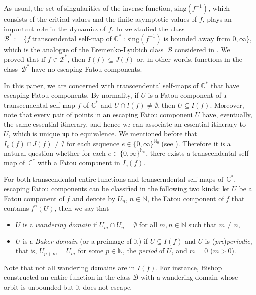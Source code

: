 \documentclass[a4paper, 12pt, reqno]{amsart}
\newcommand{\margin}[1]{\marginnote{\red{#1}}}
\numberwithin{equation}{section}
\newcommand{\red}[1]{{\color{red} #1}}
\theoremstyle{plain}
\theoremstyle{definition}
\theoremstyle{remark}
\newcommand{\C}{{\mathbb{C}}}
\newcommand{\CS}{{\mathbb{C}^*}}
\newcommand{\B}{\mathcal B}
\newcommand{\N}{{\mathbb{N}}}
\begin{document}
As usual, the set of singularities of the inverse function, $\mbox{sing}(f^{-1})$, which consists of the critical values and the finite asymptotic values of $f$, plays an important role in the dynamics of $f$. In \cite{fagella-martipete} we studied the class 
$$
\B^*:=\{f \mbox{ transcendental self-map of } \CS\ :\ \mbox{sing}(f^{-1}) \mbox{ is bounded away from } 0,\infty\},
$$
which is the analogue of the Eremenko-Lyubich class~$\mathcal{B}$ considered in \cite{eremenko-lyubich92}. We proved that if $f\in \B^*$, then $I(f)\subseteq J(f)$ or, in other words, functions in the class~$\mathcal{B}^*$ have no escaping Fatou components. 

In this paper, we are concerned with transcendental self-maps of $\C^*$ that have escaping Fatou components. By normality, if $U$ is a Fatou component of a transcendental self-map $f$ of $\C^*$ and $U\cap I(f)\neq\emptyset$, then $U\subseteq I(f)$. Moreover, note that every pair of points in an escaping Fatou component $U$ have, eventually, the same essential itinerary, and hence we can associate an essential itinerary to $U$, which is unique up to equivalence. We mentioned before that $I_e(f)\cap J(f)\neq \emptyset$ for each sequence $e\in\{0,\infty\}^{\N_0}$ (see \cite[Theorem~1.1]{martipete1}). Therefore it is a natural question whether for each $e\in\{0,\infty\}^{\N_0}$, there exists a transcendental self-map of~$\C^*$ with a Fatou component in $I_e(f)$.


For both transcendental entire functions and transcendental self-maps of~$\C^*$, escaping Fatou components can be classified in the following two kinds: let $U$ be a Fatou component of $f$ and denote by $U_n$, $n\in\mathbb{N}$, the Fatou component of $f$ that contains $f^n(U)$, then we say that\vspace{-1pt}
\begin{itemize}
\item $U$ is a \textit{wandering domain} if $U_m\cap U_n=\emptyset$ for all $m,n\in\N$ such that $m\neq n$,\vspace*{1pt}
\item $U$ is a \textit{Baker domain} (or a preimage of it) if $U\subseteq I(f)$ and $U$ is (\textit{pre})\textit{periodic}, that is, $U_{p+m}=U_m$ for some $p\in \mathbb{N}$, the \textit{period} of $U$, and $m=0$ ($m>0$).\vspace{-1pt}
\end{itemize}
Note that not all wandering domains are in $I(f)$. For instance, Bishop~\cite[Theorem~17.1]{bishop15} constructed an entire function in the class $\B$ with a wandering domain whose orbit is unbounded but it does not escape. %
\end{document}
